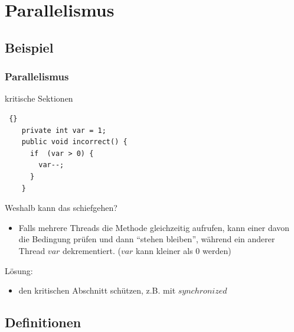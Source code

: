\section{Parallelismus}

\subsection{Beispiel}
\begin{frame}[fragile]
\frametitle {Parallelismus} 
	\begin{block} {kritische Sektionen}

	\begin{lstlisting} {}
	private int var = 1;
	public void incorrect() {
	  if  (var > 0) {
  	    var--;
	  }
	}
	\end{lstlisting}
	
	Weshalb kann das schiefgehen? \\
		\visible<2-> {
		\begin{itemize}
			\item Falls mehrere Threads die Methode gleichzeitig aufrufen, kann einer davon die Bedingung 				prüfen und dann ``stehen bleiben'', während ein anderer Thread $var$ dekrementiert. ($var$ 				kann kleiner als 0 werden)\\
		\end{itemize}
		}
	Lösung: 
		\visible<3-> {
		\begin{itemize}
			\item den kritischen Abschnitt schützen, z.B. mit $synchronized$ 
		\end{itemize}
		}
	\end{block} 
\end{frame}

\subsection{Definitionen}



